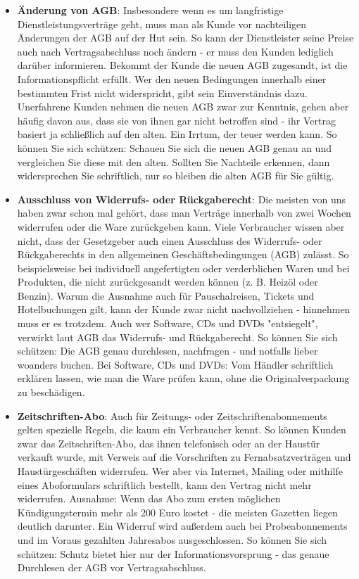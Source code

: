 \documentclass[a4paper]{article}
\begin{document}
\begin{itemize}
\item \textbf{Änderung von AGB}: Insbesondere wenn es um langfristige Dienstleistungsverträge geht, muss man als Kunde vor nachteiligen Änderungen der AGB auf der Hut sein. So kann der Dienstleister seine Preise auch nach Vertragsabschluss noch ändern - er muss den Kunden lediglich darüber informieren. Bekommt der Kunde die neuen AGB zugesandt, ist die Informationspflicht erfüllt. Wer den neuen Bedingungen innerhalb einer bestimmten Frist nicht widerspricht, gibt sein Einverständnis dazu. Unerfahrene Kunden nehmen die neuen AGB zwar zur Kenntnis, gehen aber häufig davon aus, dass sie von ihnen gar nicht betroffen sind - ihr Vertrag basiert ja schließlich auf den alten. Ein Irrtum, der teuer werden kann. So können Sie sich schützen: Schauen Sie sich die neuen AGB genau an und vergleichen Sie diese mit den alten. Sollten Sie Nachteile erkennen, dann widersprechen Sie schriftlich, nur so bleiben die alten AGB für Sie gültig.

\item \textbf{Ausschluss von Widerrufs- oder Rückgaberecht}: Die meisten von uns haben zwar schon mal gehört, dass man Verträge innerhalb von zwei Wochen widerrufen oder die Ware zurückgeben kann. Viele Verbraucher wissen aber nicht, dass der Gesetzgeber auch einen Ausschluss des Widerrufs- oder Rückgaberechts in den allgemeinen Geschäftsbedingungen (AGB) zulässt. So beispielsweise bei individuell angefertigten oder verderblichen Waren und bei Produkten, die nicht zurückgesandt werden können (z. B. Heizöl oder Benzin). Warum die Ausnahme auch für Pauschalreisen, Tickets und Hotelbuchungen gilt, kann der Kunde zwar nicht nachvollziehen - hinnehmen muss er es trotzdem. Auch wer Software, CDs und DVDs "entsiegelt", verwirkt laut AGB das Widerrufs- und Rückgaberecht. So können Sie sich schützen: Die AGB genau durchlesen, nachfragen - und notfalls lieber woanders buchen. Bei Software, CDs und DVDs: Vom Händler schriftlich erklären lassen, wie man die Ware prüfen kann, ohne die Originalverpackung zu beschädigen.

\item \textbf{Zeitschriften-Abo}: Auch für Zeitungs- oder Zeitschriftenabonnements gelten spezielle Regeln, die kaum ein Verbraucher kennt. So können Kunden zwar das Zeitschriften-Abo, das ihnen telefonisch oder an der Haustür verkauft wurde, mit Verweis auf die Vorschriften zu Fernabsatzverträgen und Haustürgeschäften widerrufen. Wer aber via Internet, Mailing oder mithilfe eines Aboformulars schriftlich bestellt, kann den Vertrag nicht mehr widerrufen. Ausnahme: Wenn das Abo zum ersten möglichen Kündigungstermin mehr als 200 Euro kostet - die meisten Gazetten liegen deutlich darunter. Ein Widerruf wird außerdem auch bei Probeabonnements und im Voraus gezahlten Jahresabos ausgeschlossen. So können Sie sich schützen: Schutz bietet hier nur der Informationsvorsprung - das genaue Durchlesen der AGB vor Vertragsabschluss.


\end{itemize}
\end{document}
